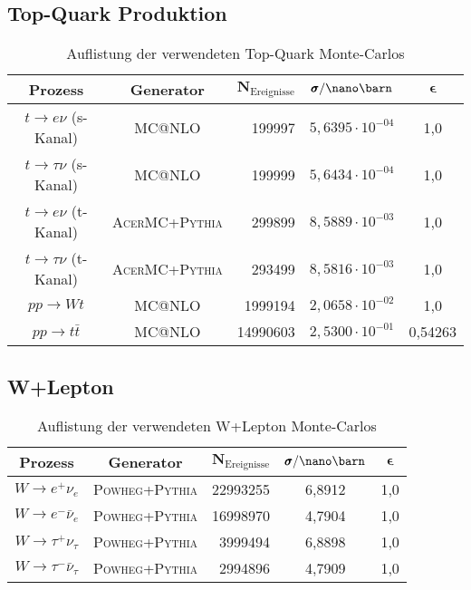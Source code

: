 \subsection*{Top-Quark Produktion} 
\begin{table}[h]
    \footnotesize
    \centering
    \begin{tabular}{|c|c|r|c|c|}
        \hline
        \bf{Prozess} & \bf{Generator} & $\pmb N_\text{Ereignisse}$ &
        $\pmb\sigma / \nano\barn$ & $\pmb\epsilon$ \\
        \hline \hline
        $t \rightarrow e\nu $ (s-Kanal)    & \textsc{MC@NLO       } & 199997   & $5,6395\cdot 10^{-04}$ & 1,0 \\
        $t \rightarrow \tau\nu $ (s-Kanal) & \textsc{MC@NLO       } & 199999   & $5,6434\cdot 10^{-04}$ & 1,0 \\
        $t \rightarrow e\nu $ (t-Kanal)    & \textsc{AcerMC+Pythia} & 299899   & $8,5889\cdot 10^{-03}$ & 1,0 \\
        $t \rightarrow \tau\nu $ (t-Kanal) & \textsc{AcerMC+Pythia} & 293499   & $8,5816\cdot 10^{-03}$ & 1,0 \\
        $pp \rightarrow Wt$                & \textsc{MC@NLO       } & 1999194  & $2,0658\cdot 10^{-02}$ & 1,0 \\
        $pp \rightarrow t \bar t$          & \textsc{MC@NLO       } & 14990603 & $2,5300\cdot 10^{-01}$ & 0,54263 \\
        \hline
    \end{tabular}
    \caption{Auflistung der verwendeten Top-Quark Monte-Carlos} 
\end{table}
\FloatBarrier

\newpage

\subsection*{W+Lepton} 
\begin{table}[h]
    \footnotesize
    \centering
    \begin{tabular}{|c|c|r|c|c|}
        \hline
        \bf{Prozess} & \bf{Generator} & $\pmb N_\text{Ereignisse}$ &
        $\pmb\sigma / \nano\barn$ & $\pmb\epsilon$ \\
        \hline \hline
        $W \rightarrow e^+\nu_e$       & \textsc{Powheg+Pythia} & 22993255 & 6,8912 & 1,0 \\
        $W \rightarrow e^-\bar\nu_e$   & \textsc{Powheg+Pythia} & 16998970 & 4,7904 & 1,0 \\
        $W \rightarrow \tau^+\nu_\tau$ & \textsc{Powheg+Pythia} & 3999494  & 6,8898 & 1,0 \\
        $W \rightarrow \tau^-\bar\nu_\tau$ & \textsc{Powheg+Pythia} & 2994896  & 4,7909 & 1,0 \\
        \hline
    \end{tabular}
    \caption{Auflistung der verwendeten W+Lepton Monte-Carlos} 
\end{table}
\FloatBarrier

